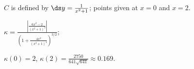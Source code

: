 {$C$ is defined by $\ds y = \frac1{x^2+1}$; points given at $x=0$ and $x=2$. 
}
{$\kappa = \frac{\left|\frac{6x^2-2}{(x^2+1)^3}\right|}{\left(1+\frac{4x^2}{(x^2+1)^4}\right)^{3/2}}$;

$\kappa(0) = 2$, $\kappa(2) = \frac{2750}{641\sqrt{641}} \approx 0.169$.
}